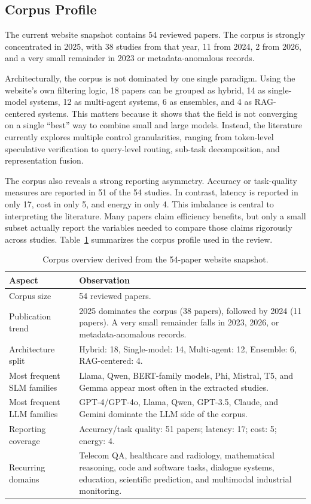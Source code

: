 \subsection{Corpus Profile}
The current website snapshot contains 54 reviewed papers. The corpus is strongly concentrated in 2025, with 38 studies from that year, 11 from 2024, 2 from 2026, and a very small remainder in 2023 or metadata-anomalous records.

Architecturally, the corpus is not dominated by one single paradigm. Using the website's own filtering logic, 18 papers can be grouped as hybrid, 14 as single-model systems, 12 as multi-agent systems, 6 as ensembles, and 4 as RAG-centered systems. This matters because it shows that the field is not converging on a single ``best'' way to combine small and large models. Instead, the literature currently explores multiple control granularities, ranging from token-level speculative verification to query-level routing, sub-task decomposition, and representation fusion.

The corpus also reveals a strong reporting asymmetry. Accuracy or task-quality measures are reported in 51 of the 54 studies. In contrast, latency is reported in only 17, cost in only 5, and energy in only 4. This imbalance is central to interpreting the literature. Many papers claim efficiency benefits, but only a small subset actually report the variables needed to compare those claims rigorously across studies. Table~\ref{tab:corpus-overview} summarizes the corpus profile used in the review.

\begin{table}[t]
\caption{Corpus overview derived from the 54-paper website snapshot.}
\label{tab:corpus-overview}
\centering
\scriptsize
\begin{tabularx}{\textwidth}{@{}>{\raggedright\arraybackslash}p{3.3cm}X@{}}
\toprule
\textbf{Aspect} & \textbf{Observation} \\
\midrule
Corpus size & 54 reviewed papers. \\
Publication trend & 2025 dominates the corpus (38 papers), followed by 2024 (11 papers). A very small remainder falls in 2023, 2026, or metadata-anomalous records. \\
Architecture split & Hybrid: 18, Single-model: 14, Multi-agent: 12, Ensemble: 6, RAG-centered: 4. \\
Most frequent SLM families & Llama, Qwen, BERT-family models, Phi, Mistral, T5, and Gemma appear most often in the extracted studies. \\
Most frequent LLM families & GPT-4/GPT-4o, Llama, Qwen, GPT-3.5, Claude, and Gemini dominate the LLM side of the corpus. \\
Reporting coverage & Accuracy/task quality: 51 papers; latency: 17; cost: 5; energy: 4. \\
Recurring domains & Telecom QA, healthcare and radiology, mathematical reasoning, code and software tasks, dialogue systems, education, scientific prediction, and multimodal industrial monitoring. \\
\bottomrule
\end{tabularx}
\end{table}

